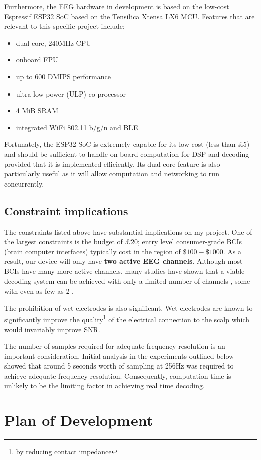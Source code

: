 Furthermore, the EEG hardware in development is based on the low-cost Espressif ESP32 SoC based on the Tensilica Xtensa LX6 MCU. Features that are relevant to this specific project include: 
\begin{itemize}
    \item dual-core, 240MHz CPU
    \item onboard FPU
    \item up to 600 DMIPS performance
    \item ultra low-power (ULP) co-processor
    \item 4 MiB SRAM
    \item integrated WiFi 802.11 b/g/n and BLE
\end{itemize}
Fortunately, the ESP32 SoC is extremely capable for its low cost (less than £5) and should be sufficient to handle on board computation for DSP and decoding provided that it is implemented efficiently. Its dual-core feature is also particularly useful as it will allow computation and networking to run concurrently. 

\subsection{Constraint implications}
The constraints listed above have substantial implications on my project. One of the largest constraints is the budget of £20; entry level consumer-grade BCIs (brain computer interfaces) typically cost in the region of $\$100-\$1000$. As a result, our device will only have \textbf{two active EEG channels}. Although most BCIs have many more active channels, many studies have shown that a viable decoding system can be achieved with only a limited number of channels \cite{Wang2011}, some with even as few as 2 \cite{Acampora2021}. 

The prohibition of wet electrodes is also significant. Wet electrodes are known to significantly improve the quality\footnote{by reducing contact impedance} of the electrical connection to the scalp which would invariably improve SNR. 

The number of samples required for adequate frequency resolution is an important consideration. Initial analysis in the experiments outlined below showed that around 5 seconds worth of sampling at 256Hz was required to achieve adequate frequency resolution. Consequently, computation time is unlikely to be the limiting factor in achieving real time decoding.

\section{Plan of Development}
